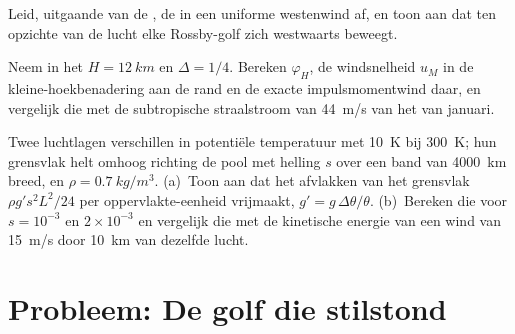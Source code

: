 \begin{exercise}[$\star\star\star$]\label{exo:b3:atmospheric-dynamics:10}
Leid, uitgaande van de , de  in een uniforme westenwind af, en toon aan dat ten opzichte van
de lucht elke Rossby-golf zich westwaarts beweegt.
\end{exercise}

\begin{exercise}[$\star\star\star$]\label{exo:b3:atmospheric-dynamics:11}
Neem in het  $H = \qty{12}{km}$ en $\Delta = 1/4$. Bereken
$\varphi_H$, de windsnelheid $u_M$ in de kleine-hoekbenadering aan de rand en de
exacte impulsmomentwind daar, en vergelijk die met de subtropische straalstroom van
\qty{44}{m/s} van het  van januari.
\end{exercise}

\begin{exercise}[$\star\star\star$]\label{exo:b3:atmospheric-dynamics:12}
Twee luchtlagen verschillen in potentiële temperatuur met \qty{10}{K} bij
\qty{300}{K}; hun grensvlak helt omhoog richting de pool met helling $s$
over een band van \qty{4000}{km} breed, en $\rho = \qty{0.7}{kg/m^3}$. (a)~Toon aan
dat het afvlakken van het grensvlak $\rho g' s^2L^2/24$ per oppervlakte-eenheid vrijmaakt,
$g' = g\,\Delta\theta/\theta$. (b)~Bereken die voor $s = 10^{-3}$ en
$2\times10^{-3}$ en vergelijk die met de kinetische energie van een wind van
\qty{15}{m/s} door \qty{10}{km} van dezelfde lucht.
\end{exercise}

\section{Probleem: De golf die stilstond}

